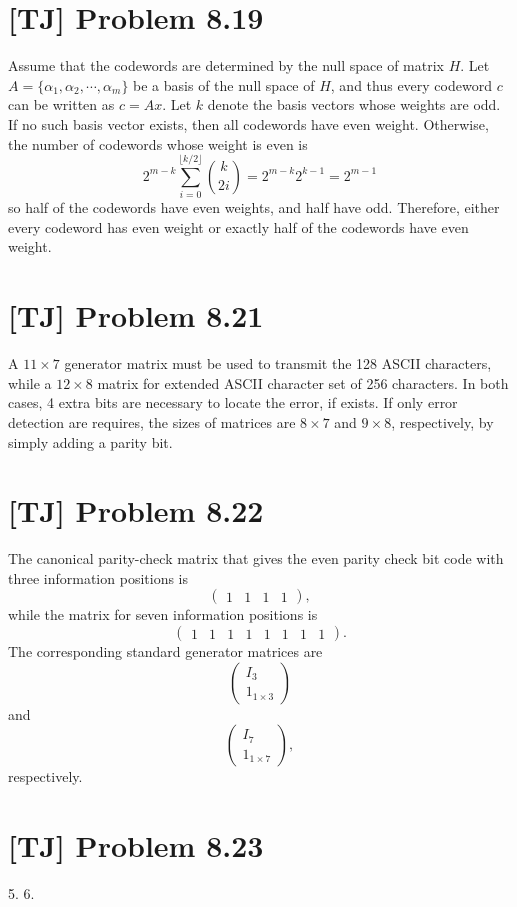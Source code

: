 \documentclass[a4paper,11pt,twocolumn]{article}
\begin{document}
  \section{[TJ] Problem 8.19}
  Assume that the codewords are determined by the null space of matrix $H$. Let $A = \{\alpha_1, \alpha_2, \cdots, \alpha_m\}$ be a basis of the null space of $H$, and thus every codeword $c$ can be written as $c = Ax$. Let $k$ denote the basis vectors whose weights are odd. If no such basis vector exists, then all codewords have even weight. Otherwise, the number of codewords whose weight is even is
  $$ 2^{m-k} \sum_{i = 0}^{\lfloor k/2 \rfloor} \binom{k}{2i} = 2^{m-k}2^{k-1} = 2^{m-1} $$
  so half of the codewords have even weights, and half have odd. Therefore, either every codeword has even weight or exactly half of the codewords have even weight.

  \section{[TJ] Problem 8.21}
  A $11 \times 7$ generator matrix must be used to transmit the 128 ASCII characters, while a $12 \times 8$ matrix for extended ASCII character set of 256 characters. In both cases, 4 extra bits are necessary to locate the error, if exists. If only error detection are requires, the sizes of matrices are $8 \times 7$ and $9 \times 8$, respectively, by simply adding a parity bit.

  \section{[TJ] Problem 8.22}
  The canonical parity-check matrix that gives the even parity check bit code with three information positions is
  $$ \begin{pmatrix} 1 & 1 & 1 & 1 \end{pmatrix}, $$
  while the matrix for seven information positions is
  $$ \begin{pmatrix} 1 & 1 & 1 & 1 & 1 & 1 & 1 & 1 \end{pmatrix}. $$
  The corresponding standard generator matrices are 
  $$ \begin{pmatrix} I_3 \\ 1_{1 \times 3}  \end{pmatrix} $$
  and
  $$ \begin{pmatrix} I_7 \\ 1_{1 \times 7}  \end{pmatrix}, $$
  respectively.
  
  \section{[TJ] Problem 8.23}
  5. 6.
\end{document}
